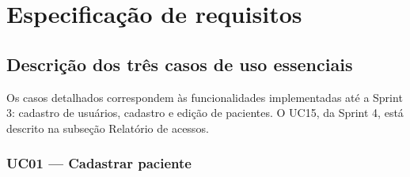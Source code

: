 \section{Especificação de requisitos}

\subsection{Descrição dos três casos de uso essenciais}

Os casos detalhados correspondem às funcionalidades implementadas até a Sprint 3: cadastro de usuários, cadastro e edição de pacientes. O UC15, da Sprint 4, está descrito na subseção Relatório de acessos.

\subsubsection{UC01 — Cadastrar paciente}

